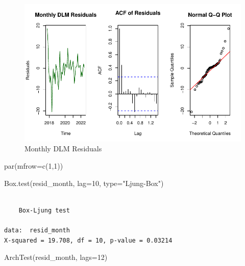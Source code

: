 \documentclass[
  11pt,
]{article}
\newenvironment{Shaded}{\begin{snugshade}}{\end{snugshade}}
\newcommand{\AttributeTok}[1]{\textcolor[rgb]{0.40,0.45,0.13}{#1}}
\newcommand{\DecValTok}[1]{\textcolor[rgb]{0.68,0.00,0.00}{#1}}
\newcommand{\FunctionTok}[1]{\textcolor[rgb]{0.28,0.35,0.67}{#1}}
\newcommand{\NormalTok}[1]{\textcolor[rgb]{0.00,0.23,0.31}{#1}}
\newcommand{\StringTok}[1]{\textcolor[rgb]{0.13,0.47,0.30}{#1}}
\begin{document}
\begin{figure}[H]

{\centering \includegraphics{project_files/figure-pdf/fig-monthlydmlresid-1.pdf}

}

\caption{Monthly DLM Residuals}

\end{figure}%

\begin{Shaded}
\begin{Highlighting}[]
\FunctionTok{par}\NormalTok{(}\AttributeTok{mfrow=}\FunctionTok{c}\NormalTok{(}\DecValTok{1}\NormalTok{,}\DecValTok{1}\NormalTok{))}
\end{Highlighting}
\end{Shaded}

\begin{Shaded}
\begin{Highlighting}[]
\FunctionTok{Box.test}\NormalTok{(resid\_month, }\AttributeTok{lag=}\DecValTok{10}\NormalTok{, }\AttributeTok{type=}\StringTok{"Ljung{-}Box"}\NormalTok{)}
\end{Highlighting}
\end{Shaded}

\begin{verbatim}

    Box-Ljung test

data:  resid_month
X-squared = 19.708, df = 10, p-value = 0.03214
\end{verbatim}

\begin{Shaded}
\begin{Highlighting}[]
\FunctionTok{ArchTest}\NormalTok{(resid\_month, }\AttributeTok{lags=}\DecValTok{12}\NormalTok{)}
\end{Highlighting}
\end{Shaded}
\end{document}
